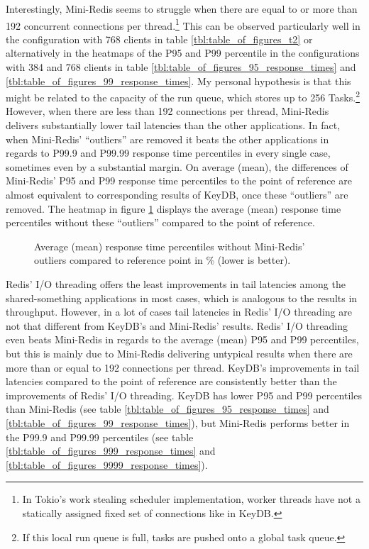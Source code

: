 Interestingly, Mini-Redis seems to struggle when there are equal to or more than 192 concurrent connections per thread.\footnote{In Tokio’s work stealing scheduler implementation, worker threads have not a statically assigned fixed set of connections like in KeyDB.} This can be observed particularly well in the configuration with 768 clients in table \ref{tbl:table_of_figures_t2} or alternatively in the heatmaps of the P95 and P99 percentile in the configurations with 384 and 768 clients in table \ref{tbl:table_of_figures_95_response_times} and \ref{tbl:table_of_figures_99_response_times}. My personal hypothesis is that this might be related to the capacity of the run queue, which stores up to 256 Tasks.\footnote{If this local run queue is full, tasks are pushed onto a global task queue.} However, when there are less than 192 connections per thread, Mini-Redis delivers substantially lower tail latencies than the other applications. In fact, when Mini-Redis’ “outliers” are removed it beats the other applications in regards to P99.9 and P99.99 response time percentiles in every single case, sometimes even by a substantial margin. On average (mean), the differences of Mini-Redis’ P95 and P99 response time percentiles to the point of reference are almost equivalent to corresponding results of KeyDB, once these “outliers” are removed. The heatmap in figure \ref{fig:avg_latency_heat_out} displays the average (mean) response time percentiles without these “outliers” compared to the point of reference. \newline 
\begin{figure}
    \centering
    \scalebox{0.6}{}
    \caption{Average (mean) response time percentiles without Mini-Redis' outliers compared to reference point in \% (lower is better).}
    \label{fig:avg_latency_heat_out}
\end{figure}
Redis’ I/O threading offers the least improvements in tail latencies among the shared-something applications in most cases, which is analogous to the results in throughput. However, in a lot of cases tail latencies in Redis’ I/O threading are not that different from KeyDB’s and Mini-Redis’ results. Redis’ I/O threading even beats Mini-Redis in regards to the average (mean) P95 and P99 percentiles, but this is mainly due to Mini-Redis delivering untypical results when there are more than or equal to 192 connections per thread. \newline 
KeyDB’s improvements in tail latencies compared to the point of reference are consistently better than the improvements of Redis’ I/O threading. KeyDB has lower P95 and P99 percentiles than Mini-Redis (see table \ref{tbl:table_of_figures_95_response_times} and \ref{tbl:table_of_figures_99_response_times}), but Mini-Redis performs better in the P99.9 and P99.99 percentiles (see table \ref{tbl:table_of_figures_999_response_times} and \ref{tbl:table_of_figures_9999_response_times}). \newline 

